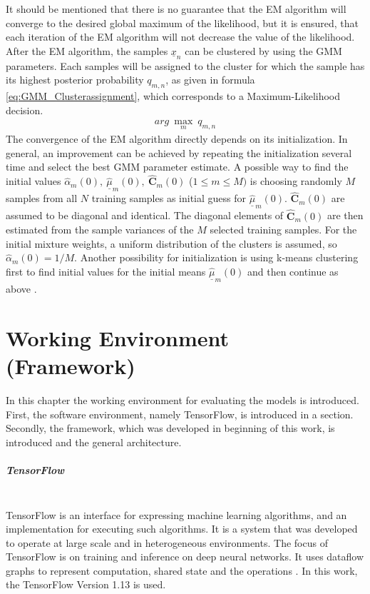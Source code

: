 \documentclass[12pt,DIV14,BCOR12mm,a4paper,footexclude,headinclude,halfparskip-,twoside,openright,cleardoubleempty,idxtotoc,bibtotoc,listtotoc]{scrreprt} %
\numberwithin{equation}{chapter}
\begin{document}
It should be mentioned that there is no guarantee that the EM algorithm will converge to the desired global maximum of the likelihood, but it is ensured, that each iteration of the EM algorithm will not decrease the value of the likelihood.\\
After the EM algorithm, the samples $\underline{x}_n$ can be clustered by using the GMM parameters. Each samples will be assigned to the cluster for which the sample has its highest posterior probability $q_{m,n}$, as given in formula \ref{eq:GMM_Clusterassignment}, which corresponds to a Maximum-Likelihood decision.
\begin{align}
	arg\ \underset{m}\max\ q_{m,n}\label{eq:GMM_Clusterassignment}
\end{align}
The convergence of the EM algorithm directly depends on its initialization. In general, an improvement can be achieved by repeating the initialization several time and select the best GMM parameter estimate. A possible way to find the initial values $\hat{\alpha}_m(0),\ \hat{\underline{\mu}}_m(0),\ \hat{\mathbf{C}}_m(0)$ ($1 \leq m \leq M)$ is choosing randomly $M$ samples from all $N$ training samples as initial guess for $\hat{\underline{\mu}}_m(0)$. $\hat{\mathbf{C}}_m(0)$ are assumed to be diagonal and identical. The diagonal elements of $\hat{\mathbf{C}}_m(0)$ are then estimated from the sample variances of the $M$ selected training samples. For the initial mixture weights, a uniform distribution of the clusters is assumed, so $\hat{\alpha}_m(0) = 1/M$. Another possibility for initialization is using k-means clustering first to find initial values for the initial means $\hat{\underline{\mu}}_m(0)$ and then continue as above \cite{LectureNotes_DPR}.
\chapter{Working Environment (Framework)}
In this chapter the working environment for evaluating the models is introduced. First, the software environment, namely TensorFlow, is introduced in a section. Secondly, the framework, which was developed in beginning of this work, is introduced and the general architecture.
\paragraph{TensorFlow}\mbox{}\\
TensorFlow is an interface for expressing machine learning algorithms, and an implementation for executing such algorithms. It is a system that was developed to operate at large scale and in heterogeneous environments. The focus of TensorFlow is on training and inference on deep neural networks. It uses dataflow graphs to represent computation, shared state and the operations \cite{tensorflow2015-whitepaper}. In this work, the TensorFlow Version 1.13 is used.
\end{document}
